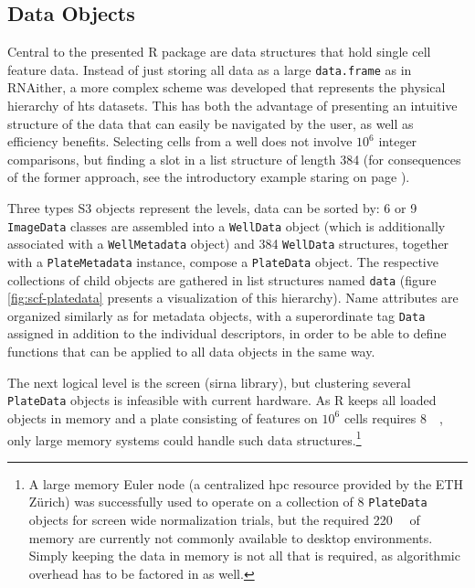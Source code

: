\subsection{Data Objects}
Central to the presented R package are data structures that hold single cell feature data. Instead of just storing all data as a large \texttt{data.frame} as in RNAither, a more complex scheme was developed that represents the physical hierarchy of \gls{hts} datasets. This has both the advantage of presenting an intuitive structure of the data that can easily be navigated by the user, as well as efficiency benefits. Selecting cells from a well does not involve $10^6$ integer comparisons, but finding a slot in a list structure of length 384 (for consequences of the former approach, see the introductory example staring on page \pageref{ex:efficiency}).

Three types S3 objects represent the levels, data can be sorted by: 6 or 9 \texttt{ImageData} classes are assembled into a \texttt{WellData} object (which is additionally associated with a \texttt{WellMetadata} object) and 384 \texttt{WellData} structures, together with a \texttt{PlateMetadata} instance, compose a \texttt{PlateData} object. The respective collections of child objects are gathered in list structures named \texttt{data} (figure \ref{fig:scf-platedata} presents a visualization of this hierarchy). Name attributes are organized similarly as for metadata objects, with a superordinate tag \texttt{Data} assigned in addition to the individual descriptors, in order to be able to define functions that can be applied to all data objects in the same way.

The next logical level is the screen (\gls{sirna} library), but clustering several \texttt{PlateData} objects is infeasible with current hardware. As R keeps all loaded objects in memory and a plate consisting of  features on \tilde$10^6$ cells requires \tilde \SI{8}{\giga\byte}, only large memory systems could handle such data structures.\footnote{A large memory Euler node (a centralized \gls{hpc} resource provided by the ETH Z\"urich) was successfully used to operate on a collection of 8 \texttt{PlateData} objects for screen wide normalization trials, but the required \tilde \SI{220}{\giga\byte} of memory are currently not commonly available to desktop environments. Simply keeping the data in memory is not all that is required, as algorithmic overhead has to be factored in as well.}

